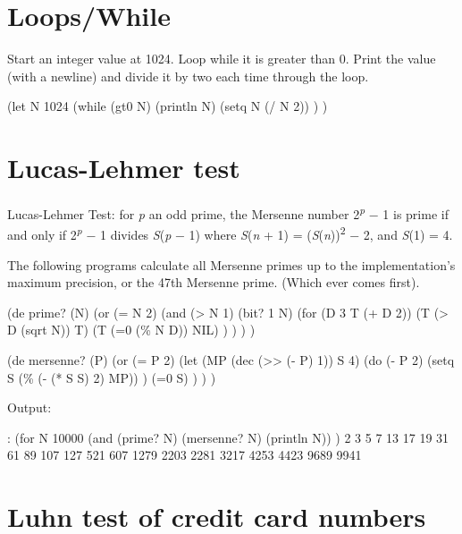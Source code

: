 \begin{itemize}
\begin{wideverbatim}
\end{wideverbatim}

\pagebreak{}
\section*{Loops/While}

Start an integer value at 1024. Loop while it is greater than 0. Print
the value (with a newline) and divide it by two each time through the
loop.

\begin{wideverbatim}

(let N 1024
   (while (gt0 N)
      (println N)
      (setq N (/ N 2)) ) )

\end{wideverbatim}

\pagebreak{}
\section*{Lucas-Lehmer test}


Lucas-Lehmer Test: for \emph{p} an odd prime, the Mersenne number
2\textsuperscript{\emph{p}} − 1 is prime if and only if
2\textsuperscript{\emph{p}} − 1 divides \emph{S}(\emph{p} − 1) where
\emph{S}(\emph{n} + 1) = (\emph{S}(\emph{n}))\textsuperscript{2} − 2,
and \emph{S}(1) = 4.

The following programs calculate all Mersenne primes up to the
implementation's maximum precision, or the 47th Mersenne prime. (Which
ever comes first).



\begin{wideverbatim}

(de prime? (N)
   (or
      (= N 2)
      (and
         (> N 1)
         (bit? 1 N)
         (for (D 3  T  (+ D 2))
            (T (> D (sqrt N)) T)
            (T (=0 (\% N D)) NIL) ) ) ) )

(de mersenne? (P)
   (or
      (= P 2)
      (let (MP (dec (>> (- P) 1))  S 4)
         (do (- P 2)
            (setq S (\% (- (* S S) 2) MP)) )
         (=0 S) ) ) )

Output:

: (for N 10000
   (and (prime? N) (mersenne? N) (println N)) )
2
3
5
7
13
17
19
31
61
89
107
127
521
607
1279
2203
2281
3217
4253
4423
9689
9941

\end{wideverbatim}

\pagebreak{}
\section*{Luhn test of credit card numbers}



\end{itemize}
